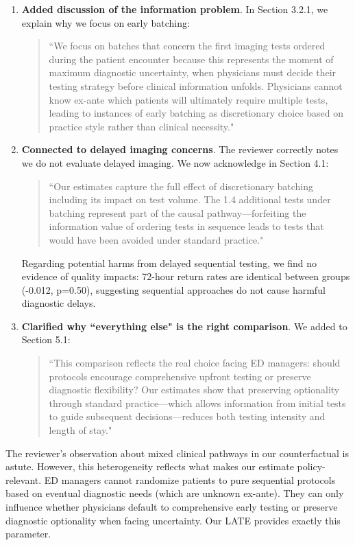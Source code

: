 \documentclass[11pt]{article}
\newcommand{\1}{\hbox{\rm 1\kern-.35em 1}}
\begin{document}
{\begin{enumerate}
    \item \textbf{Added discussion of the information problem}. In Section 3.2.1, we explain why we focus on early batching:
    \begin{quote}
    ``We focus on batches that concern the first imaging tests ordered during the patient encounter because this represents the moment of maximum diagnostic uncertainty, when physicians must decide their testing strategy before clinical information unfolds. Physicians cannot know ex-ante which patients will ultimately require multiple tests, leading to instances of early batching as discretionary choice based on practice style rather than clinical necessity."
    \end{quote}
    
\item \textbf{Connected to delayed imaging concerns}. The reviewer correctly notes we do not evaluate delayed imaging. We now acknowledge in Section 4.1:
\begin{quote}
    ``Our estimates capture the full effect of discretionary batching including its impact on test volume. The 1.4 additional tests under batching represent part of the causal pathway---forfeiting the information value of ordering tests in sequence leads to tests that would have been avoided under standard practice."
\end{quote}
Regarding potential harms from delayed sequential testing, we find no evidence of quality impacts: 72-hour return rates are identical between groups (-0.012, p=0.50), suggesting sequential approaches do not cause harmful diagnostic delays.

\item \textbf{Clarified why ``everything else" is the right comparison}. We added to Section 5.1:
\begin{quote}
    ``This comparison reflects the real choice facing ED managers: should protocols encourage comprehensive upfront testing or preserve diagnostic flexibility? Our estimates show that preserving optionality through standard practice—which allows information from initial tests to guide subsequent decisions—reduces both testing intensity and length of stay."
\end{quote}
\end{enumerate}

The reviewer's observation about mixed clinical pathways in our counterfactual is astute. However, this heterogeneity reflects what makes our estimate policy-relevant. ED managers cannot randomize patients to pure sequential protocols based on eventual diagnostic needs (which are unknown ex-ante). They can only influence whether physicians default to comprehensive early testing or preserve diagnostic optionality when facing uncertainty. Our LATE provides exactly this parameter.

}
\end{document}
